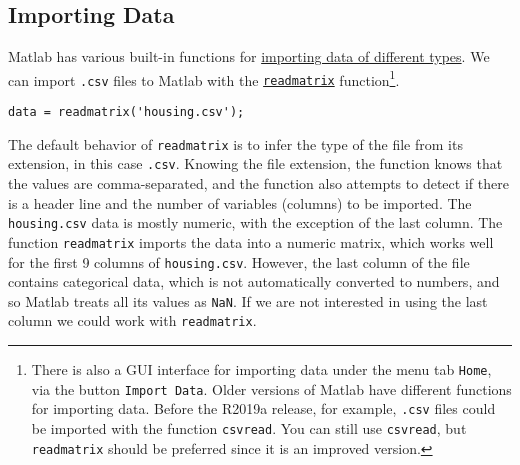 \documentclass[12pt, a4paper]{article}
\begin{document}
\subsection{Importing Data}
\label{sec:orgab1b423}
Matlab has various built-in functions for \href{https://www.mathworks.com/help/matlab/data-import-and-export.html}{importing data of different types}.
We can import \texttt{.csv} files to Matlab with the \href{https://www.mathworks.com/help/matlab/ref/readmatrix.html}{\texttt{readmatrix}} function\footnote{There is also a GUI interface for importing data under the menu tab \texttt{Home}, via the button \texttt{Import Data}. Older versions of Matlab have different functions for importing data. Before the R2019a release, for example, \texttt{.csv} files could be imported with the function \texttt{csvread}. You can still use \texttt{csvread}, but \texttt{readmatrix} should be preferred since it is an improved version.}.
\lstset{language=matlab,label= ,caption= ,captionpos=b,firstnumber=1,numbers=left,style=Matlab-editor}
\begin{lstlisting}
data = readmatrix('housing.csv');
\end{lstlisting}
The default behavior of \texttt{readmatrix} is to infer the type of the file from its extension, in this case \texttt{.csv}.
Knowing the file extension, the function knows that the values are comma-separated, and the function also attempts to detect if there is a header line and the number of variables (columns) to be imported.
The \texttt{housing.csv} data is mostly numeric, with the exception of the last column.
The function \texttt{readmatrix} imports the data into a numeric matrix, which works well for the first 9 columns of \texttt{housing.csv}.
However, the last column of the file contains categorical data, which is not automatically converted to numbers, and so Matlab treats all its values as \texttt{NaN}.
If we are not interested in using the last column we could work with \texttt{readmatrix}.
\end{document}
